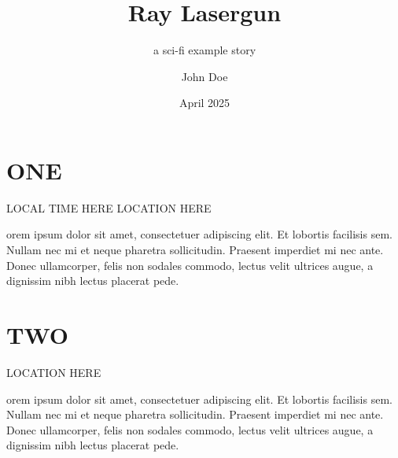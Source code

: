 \documentclass{scifi_book}
\title{Ray Lasergun}
\subtitle{a sci-fi example story}
\author{John Doe}
\date{April 2025}
\begin{document}
\maketitle


\chapter*{ONE}

{LOCAL TIME HERE}
{LOCATION HERE}

orem ipsum dolor sit amet, consectetuer adipiscing elit. Et lobortis facilisis sem.
Nullam nec mi et neque pharetra sollicitudin. Praesent imperdiet mi nec ante. Donec ullamcorper,
felis non sodales commodo, lectus velit ultrices augue, a dignissim nibh lectus placerat pede.

\blindtext

\blindtext

\blindtext[2]


\chapter*{TWO}

{LOCATION HERE}

orem ipsum dolor sit amet, consectetuer adipiscing elit. Et lobortis facilisis sem.
Nullam nec mi et neque pharetra sollicitudin. Praesent imperdiet mi nec ante. Donec ullamcorper,
felis non sodales commodo, lectus velit ultrices augue, a dignissim nibh lectus placerat pede.

\blindtext

\blindtext
\end{document}
